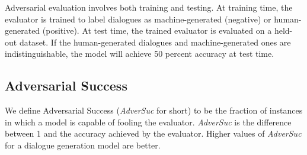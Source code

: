 \documentclass[11pt]{article}
\begin{document}
Adversarial evaluation involves both  training and testing. 
At training time, the evaluator is trained to
label dialogues as machine-generated (negative) or  human-generated (positive). 
At test time, the trained evaluator is evaluated on a held-out dataset.
If the human-generated dialogues and machine-generated ones are indistinguishable, the model  will achieve 50 percent accuracy at test time.  
\subsection{Adversarial Success}
We define Adversarial Success ({\it AdverSuc} for short) to be the fraction of instances in which a model is capable of fooling the evaluator. {\it AdverSuc} is the difference between 1 and the accuracy 
achieved by the  evaluator. Higher values of {\it AdverSuc} for a dialogue generation model are better. 
\begin{comment}
Existing evaluation metrics---e.g., word-overlap metrics such as BLEU and METEOR, or the recently proposed dialogue evaluation metric ADEM \cite{hey}, which learns to predict human evaluation score to input responses---all focus on single turn dialogue quality evaluation. We argue that a dialogue generation model can be more properly evaluated on multi-turn dialogues. 
This is comparable to  the Turing test, in which the human evaluator is asked to chat with the machine for five minutes rather than just a single turn. 
We therefore propose evaluating the model
using multi-turn dialogues generated 
 by having  two bots  talk with each other. 
 \end{comment}
\begin{comment}
We  report {\it AdverSuc} scores
 on dialogues with different numbers of simulated turns (length), specifically, {\it AdverSuc-1}, {\it AdverSuc-2} and {\it AdverSuc-3}, where {\it AdverSuc-N} denotes
the 
{\it AdverSuc} score
 of an evaluator trained on dialogues 
 between the two bots
 simulated for $N$ turns. Theoretically, the larger $N$ is, the easier it is for the discriminator to recognize a machine-generated dialogue and thus the lower the {\it AdverSuc} score should be. 
 \end{comment}
\end{document}
